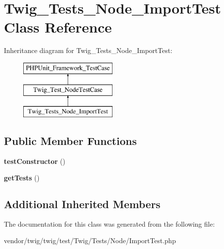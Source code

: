 \hypertarget{classTwig__Tests__Node__ImportTest}{}\section{Twig\+\_\+\+Tests\+\_\+\+Node\+\_\+\+Import\+Test Class Reference}
\label{classTwig__Tests__Node__ImportTest}
Inheritance diagram for Twig\+\_\+\+Tests\+\_\+\+Node\+\_\+\+Import\+Test\+:\begin{figure}[H]
\begin{center}
\leavevmode
\includegraphics[height=3.000000cm]{classTwig__Tests__Node__ImportTest}
\end{center}
\end{figure}
\subsection*{Public Member Functions}
\begin{DoxyCompactItemize}
\item 
{\bfseries test\+Constructor} ()\hypertarget{classTwig__Tests__Node__ImportTest_a0d549363998398500a0c3e52ca002511}{}\label{classTwig__Tests__Node__ImportTest_a0d549363998398500a0c3e52ca002511}

\item 
{\bfseries get\+Tests} ()\hypertarget{classTwig__Tests__Node__ImportTest_a6167fcd0dd81c7d29e0e60ca7768983c}{}\label{classTwig__Tests__Node__ImportTest_a6167fcd0dd81c7d29e0e60ca7768983c}

\end{DoxyCompactItemize}
\subsection*{Additional Inherited Members}


The documentation for this class was generated from the following file\+:\begin{DoxyCompactItemize}
\item 
vendor/twig/twig/test/\+Twig/\+Tests/\+Node/Import\+Test.\+php\end{DoxyCompactItemize}
